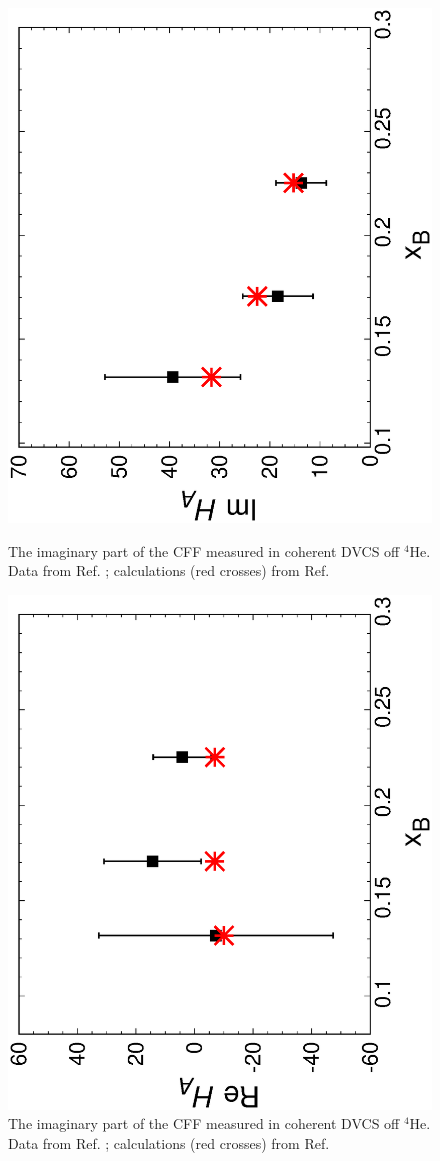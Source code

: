 \documentclass[times, twoside]{PosWhiPap}
\begin{document}
\begin{figure}%
\includegraphics[width=.7\linewidth, angle=270]{Figures/imxb.eps}
\caption{The imaginary part of the CFF measured in coherent DVCS off $^4$He.
Data from Ref. \cite{Hattawy:2017woc}; calculations (red crosses) from
Ref. \cite{Fucini:2018gso}}
\label{uno}
\includegraphics[width=.7\linewidth, angle=270]{Figures/rexb.eps}
\caption{
The imaginary part of the CFF measured in coherent DVCS off $^4$He.
Data from Ref. \cite{Hattawy:2017woc}; calculations (red crosses) from
Ref. \cite{Fucini:2018gso}
}
\label{due}
\end{figure}
\end{document}
